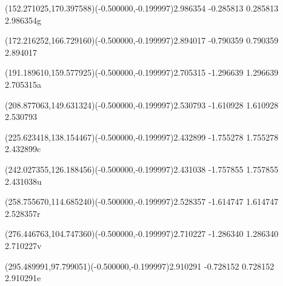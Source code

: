 \documentclass[12pt]{article}
\begin{document}
\fontsize{12.000000}{14.400000}\selectfont%
\ASYalignT(152.271025,170.397588)(-0.500000,-0.199997){2.986354 -0.285813 0.285813 2.986354}{\vphantom{\strut}g}%
%
%
\fontsize{12.000000}{14.400000}\selectfont%
\ASYalignT(172.216252,166.729160)(-0.500000,-0.199997){2.894017 -0.790359 0.790359 2.894017}{\vphantom{\strut} }%
%
%
\fontsize{12.000000}{14.400000}\selectfont%
\ASYalignT(191.189610,159.577925)(-0.500000,-0.199997){2.705315 -1.296639 1.296639 2.705315}{\vphantom{\strut}a}%
%
%
\fontsize{12.000000}{14.400000}\selectfont%
\ASYalignT(208.877063,149.631324)(-0.500000,-0.199997){2.530793 -1.610928 1.610928 2.530793}{\vphantom{\strut} }%
%
%
\fontsize{12.000000}{14.400000}\selectfont%
\ASYalignT(225.623418,138.154467)(-0.500000,-0.199997){2.432899 -1.755278 1.755278 2.432899}{\vphantom{\strut}c}%
%
%
\fontsize{12.000000}{14.400000}\selectfont%
\ASYalignT(242.027355,126.188456)(-0.500000,-0.199997){2.431038 -1.757855 1.757855 2.431038}{\vphantom{\strut}u}%
%
%
\fontsize{12.000000}{14.400000}\selectfont%
\ASYalignT(258.755670,114.685240)(-0.500000,-0.199997){2.528357 -1.614747 1.614747 2.528357}{\vphantom{\strut}r}%
%
%
\fontsize{12.000000}{14.400000}\selectfont%
\ASYalignT(276.446763,104.747360)(-0.500000,-0.199997){2.710227 -1.286340 1.286340 2.710227}{\vphantom{\strut}v}%
%
%
\fontsize{12.000000}{14.400000}\selectfont%
\ASYalignT(295.489991,97.799051)(-0.500000,-0.199997){2.910291 -0.728152 0.728152 2.910291}{\vphantom{\strut}e}%
\end{document}
